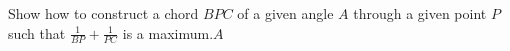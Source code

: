 Show how to construct a chord $BPC$ of a given angle $A$ through a given point $P$ such that $\tfrac{1}{BP}+ \tfrac{1}{PC}$ is a maximum.$A$